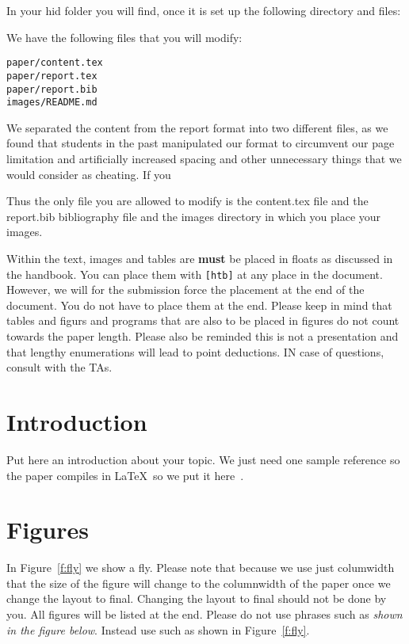 In your hid folder you will find, once it is set up the following
directory and files:


We have the following files that you will modify:

\begin{verbatim}
paper/content.tex
paper/report.tex
paper/report.bib
images/README.md
\end{verbatim}

We separated the content from the report format into two different
files, as we found that students in the past manipulated our format to
circumvent our page limitation and artificially increased spacing and
other unnecessary things that we would consider as cheating.
If you

Thus the only file you are allowed to modify is the content.tex file
and the report.bib bibliography file and the images directory in which
you place your images.

Within the text, images and tables are {\bf must} be placed in floats
as discussed in the handbook. You can place them with \verb|[htb]| at
any place in the document. However, we will for the submission force
the placement at the end of the document. You do not have to place
them at the end. Please keep in mind that tables and figurs and
programs that are also to be placed in figures do not count towards
the paper length. Please also be reminded this is not a presentation
and that lengthy enumerations will lead to point deductions. IN case
of questions, consult with the TAs.

\section{Introduction}

Put here an introduction about your topic. 
We just need one sample reference so the paper compiles in \LaTeX\ so we
put it here~\cite{editor00}.

\section{Figures}

In Figure~\ref{f:fly} we show a fly. Please note that because we use
just columwidth that the size of the figure will change to the
columnwidth of the paper once we change the layout to final. Changing
the layout to final should not be done by you. All figures will be
listed at the end.  Please do not use phrases such as \textit{shown in
  the figure below}. Instead use such as shown in Figure~\ref{f:fly}.

